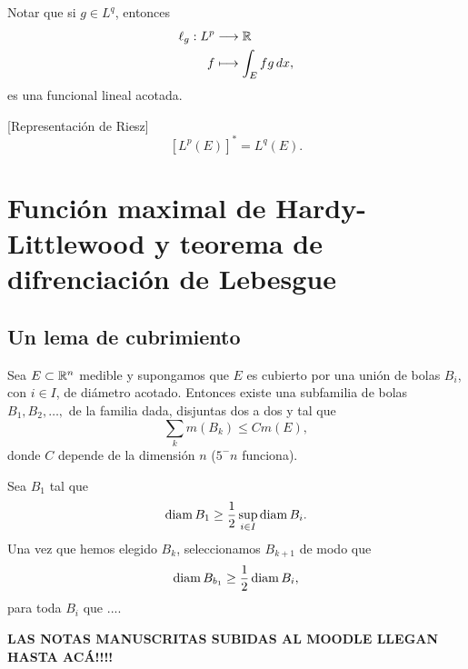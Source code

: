 Notar que si $g \in L^q$, entonces
\[\begin{split}
\ell_g: L^p &\longrightarrow \mathbb{R}
\\
f &\longmapsto \int_E fg\,dx,
\end{split}
\]
es una funcional lineal acotada. 

\begin{teorema}{}[Representaci\'on de Riesz]
\[
[L^p(E)]^*=L^q(E).\]
\end{teorema}

\section{Funci\'on maximal de Hardy-Littlewood y teorema de difrenciaci\'on de Lebesgue}


\subsection{Un lema de cubrimiento}

\begin{lema}{}
Sea $E \subset \mathbb{R}^n$ medible y supongamos que $E$ es cubierto por una uni\'on de bolas $B_i$, con $i\in I$, de di\'ametro acotado. Entonces  existe una subfamilia de bolas $B_1,B_2,\ldots,$ de la familia dada, disjuntas dos a dos y  tal que 
\[
\sum\limits_{k} m(B_k) \leq Cm(E),
\]
donde $C$ depende de la dimensi\'on $n$ ($5^-n$ funciona).
\end{lema}

\begin{demo}
Sea $B_1$ tal que 
\[
\operatorname{diam} B_1 \geq \frac{1}{2} \sup\limits_{i \in I} \operatorname{diam} B_i.
\]
Una vez que hemos elegido $B_k$, seleccionamos $B_{k+1}$ de modo que 
\[
\operatorname{diam} B_{b_1}\geq \frac{1}{2} \operatorname{diam} B_i,
\]
para toda $B_i$ que ....
\end{demo}

\textbf{
LAS NOTAS MANUSCRITAS SUBIDAS AL MOODLE LLEGAN HASTA AC\'A!!!!}